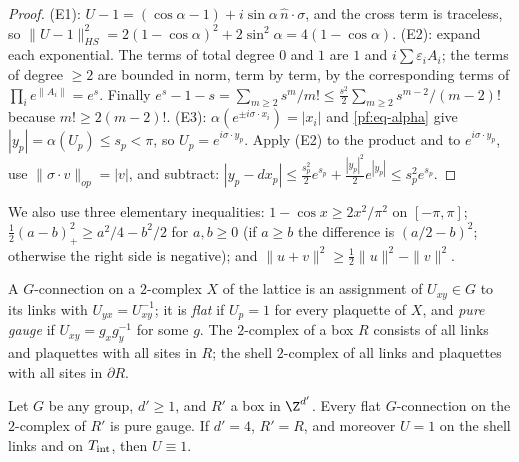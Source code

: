 \begin{proof}
(E1): $U-1=(\cos\alpha-1)+i\sin\alpha\,\hat n\cdot\sigma$, and the cross term is traceless, so $\|U-1\|_{HS}^2=2(1-\cos\alpha)^2+2\sin^2\alpha=4(1-\cos\alpha)$.
(E2): expand each exponential. The terms of total degree $0$ and $1$ are $1$ and $i\sum\varepsilon_iA_i$; the terms of degree $\ge2$ are bounded in norm, term by term, by the corresponding terms of $\prod_ie^{\|A_i\|}=e^s$. Finally $e^s-1-s=\sum_{m\ge2}s^m/m!\le\frac{s^2}2\sum_{m\ge2}s^{m-2}/(m-2)!$ because $m!\ge2(m-2)!$.
(E3): $\alpha(e^{\pm i\sigma\cdot x_i})=|x_i|$ and \eqref{pf:eq-alpha} give $|y_p|=\alpha(U_p)\le s_p<\pi$, so $U_p=e^{i\sigma\cdot y_p}$. Apply (E2) to the product and to $e^{i\sigma\cdot y_p}$, use $\|\sigma\cdot v\|_{op}=|v|$, and subtract: $|y_p-dx_p|\le\frac{s_p^2}2e^{s_p}+\frac{|y_p|^2}2e^{|y_p|}\le s_p^2e^{s_p}$.
\end{proof}

We also use three elementary inequalities: $1-\cos x\ge2x^2/\pi^2$ on $[-\pi,\pi]$; $\tfrac12(a-b)_+^2\ge a^2/4-b^2/2$ for $a,b\ge0$ (if $a\ge b$ the difference is $(a/2-b)^2$; otherwise the right side is negative); and $\|u+v\|^2\ge\tfrac12\|u\|^2-\|v\|^2$.

A $G$-connection on a $2$-complex $X$ of the lattice is an assignment of $U_{xy}\in G$ to its links with $U_{yx}=U_{xy}^{-1}$; it is \emph{flat} if $U_p=1$ for every plaquette of $X$, and \emph{pure gauge} if $U_{xy}=g_xg_y^{-1}$ for some $g$. The $2$-complex of a box $R$ consists of all links and plaquettes with all sites in $R$; the shell $2$-complex of all links and plaquettes with all sites in $\partial R$.

\begin{lemma}\label{pf:lem-flat}
Let $G$ be any group, $d'\ge1$, and $R'$ a box in $\Z^{d'}$. Every flat $G$-connection on the $2$-complex of $R'$ is pure gauge. If $d'=4$, $R'=R$, and moreover $U=1$ on the shell links and on $T_{\rm int}$, then $U\equiv1$.
\end{lemma}


